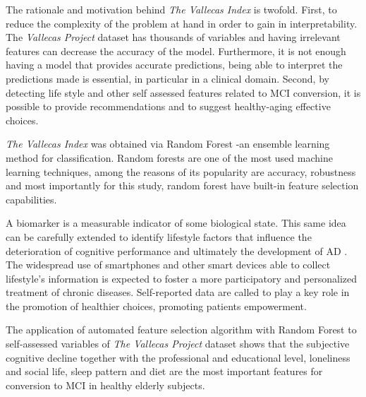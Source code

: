 \documentclass[preprint,12pt]{elsarticle}
\begin{document}
The rationale and motivation behind \emph{The Vallecas Index} is twofold. First, to reduce the complexity of the problem at hand in order to gain in interpretability. The \emph{Vallecas Project} dataset has thousands of variables and having irrelevant features can decrease the accuracy of the model. Furthermore, it is not enough having a model that provides accurate predictions, being able to interpret the predictions made is essential, in particular in a clinical domain.
Second, by detecting life style and other self assessed features related to MCI conversion, it is possible to provide recommendations and to suggest healthy-aging effective choices.


\emph{The Vallecas Index} was obtained via Random Forest -an ensemble learning method for classification. Random forests are one of the most used machine learning techniques, among the reasons of its popularity are accuracy, robustness and most importantly for this study, random forest have built-in feature selection capabilities. 

A biomarker is a measurable indicator of some biological state. This same idea can be carefully extended to identify lifestyle factors that influence the deterioration of cognitive performance and ultimately the development of AD \cite{ellis2010addressing}. The widespread use of smartphones and other smart devices able to collect lifestyle's information is expected to foster a more participatory and personalized treatment of chronic diseases. Self-reported data are called to play a key role in the promotion of healthier choices, promoting patients empowerment. 

The application of automated feature selection algorithm with Random Forest to self-assessed variables of \emph{The Vallecas Project} dataset shows that the subjective cognitive decline together with the professional and educational level, loneliness and social life, sleep pattern and diet are the most important features for conversion to MCI in healthy elderly subjects.
\end{document}
